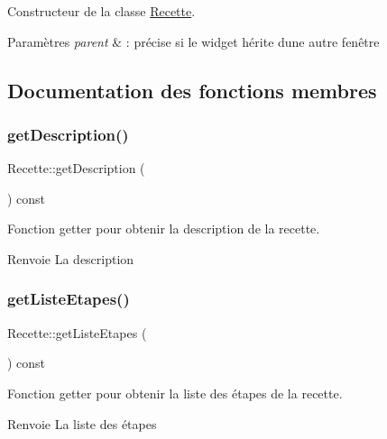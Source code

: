 Constructeur de la classe \hyperlink{classRecette}{Recette}. 


\begin{DoxyParams}{Paramètres}
{\em parent} & \+: précise si le widget hérite d\textquotesingle{}une autre fenêtre \\
\hline
\end{DoxyParams}


\subsection{Documentation des fonctions membres}
\mbox{\label{classRecette_a7f3746b691f39d1b468b29819ad3c265}} 
\subsubsection{\texorpdfstring{get\+Description()}{getDescription()}}
{\footnotesize\ttfamily Recette\+::get\+Description (\begin{DoxyParamCaption}{ }\end{DoxyParamCaption}) const}



Fonction getter pour obtenir la description de la recette. 

\begin{DoxyReturn}{Renvoie}
La description 
\end{DoxyReturn}
\mbox{\label{classRecette_a3b2807fe1f55431bcd632bff2332c6e7}} 
\subsubsection{\texorpdfstring{get\+Liste\+Etapes()}{getListeEtapes()}}
{\footnotesize\ttfamily Recette\+::get\+Liste\+Etapes (\begin{DoxyParamCaption}{ }\end{DoxyParamCaption}) const}



Fonction getter pour obtenir la liste des étapes de la recette. 

\begin{DoxyReturn}{Renvoie}
La liste des étapes 
\end{DoxyReturn}
\mbox{\label{classRecette_a3ca29579050212dea9da71e9c1f05119}} 
